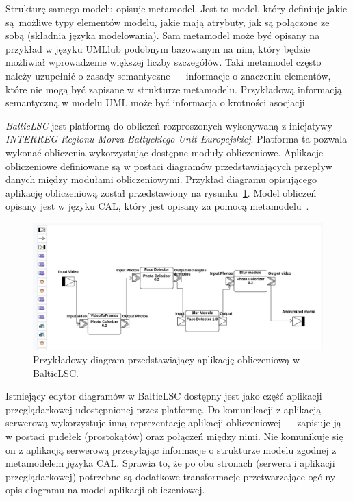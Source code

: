 Strukturę samego modelu opisuje metamodel. Jest to model, który definiuje jakie
są~możliwe typy elementów modelu, jakie mają atrybuty, jak są połączone ze
sobą (składnia języka modelowania). Sam metamodel może być opisany na przykład
w języku UML\@ lub podobnym
bazowanym na nim, który będzie możliwiał wprowadzenie większej liczby
szczegółów. Taki metamodel często należy uzupełnić o zasady semantyczne ---
informacje o znaczeniu elementów, które nie mogą być zapisane w strukturze
metamodelu. Przykładową informacją semantyczną w modelu UML może być informacja
o krotności asocjacji.

\emph{BalticLSC} jest platformą do obliczeń rozproszonych wykonywaną z
inicjatywy
\emph{INTERREG Regionu Morza Bałtyckiego Unit Europejskiej}. Platforma ta
pozwala
wykonać obliczenia wykorzystując dostępne moduły obliczeniowe. Aplikacje
obliczeniowe definiowane są w postaci diagramów przedstawiających przepływ
danych między modułami obliczeniowymi. Przykład diagramu opisującego aplikację
obliczeniową został przedstawiony na
rysunku~\ref{rys:przykladowy-diagram-balticlsc}.  Model obliczeń opisany jest w
języku \gls{CAL}, który jest opisany za pomocą metamodelu~\cite{cal-metamodel}.

\begin{figure}[!hb]
	\centering

	\includegraphics[width=0.95\linewidth]{./images/balticlsc-example-diagram.png}
	\caption{Przykładowy diagram przedstawiający aplikację obliczeniową w
		BalticLSC\@.}\label{rys:przykladowy-diagram-balticlsc}
\end{figure}

Istniejący edytor diagramów w BalticLSC dostępny jest jako część aplikacji
przeglądarkowej udostępnionej przez platformę. Do komunikacji z aplikacją
serwerową wykorzystuje inną reprezentację aplikacji obliczeniowej --- zapisuje
ją w postaci pudełek (prostokątów) oraz połączeń między nimi. Nie komunikuje
się on z aplikacją serwerową przesyłając informacje o strukturze modelu
zgodnej z metamodelem języka \gls{CAL}. Sprawia to, że po obu stronach (serwera
i aplikacji przeglądarkowej) potrzebne są dodatkowe transformacje
przetwarzające ogólny opis diagramu na model aplikacji obliczeniowej.

